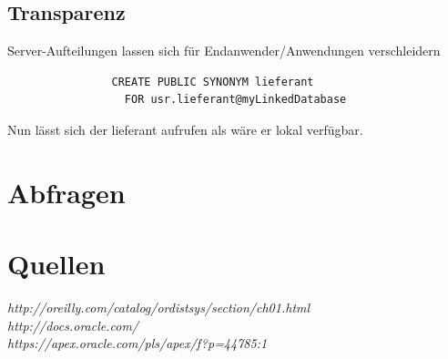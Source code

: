 \documentclass[12pt,a4paper]{article}
\begin{document}
         \subsection{Transparenz}
            Server-Aufteilungen lassen sich für Endanwender/Anwendungen verschleidern
            \begin{verbatim}
                CREATE PUBLIC SYNONYM lieferant
                  FOR usr.lieferant@myLinkedDatabase
            \end{verbatim}
            Nun lässt sich der lieferant aufrufen als wäre er lokal verfügbar.

\section{Abfragen}
	\section{Quellen}
	\emph{http://oreilly.com/catalog/ordistsys/section/ch01.html}\\
	\emph{http://docs.oracle.com/}\\
	\emph{https://apex.oracle.com/pls/apex/f?p=44785:1}
	
\end{document}
